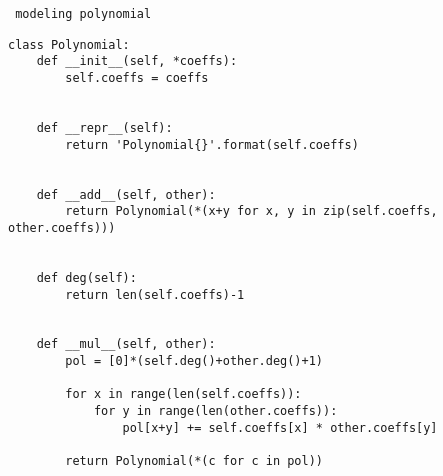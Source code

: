 \begin{center}
\texttt{ modeling polynomial}
\end{center}
\begin{verbatim}
class Polynomial:
	def __init__(self, *coeffs):
		self.coeffs = coeffs

	
	def __repr__(self):
		return 'Polynomial{}'.format(self.coeffs)

	
	def __add__(self, other):
		return Polynomial(*(x+y for x, y in zip(self.coeffs, other.coeffs)))

	
	def deg(self):
		return len(self.coeffs)-1

	
	def __mul__(self, other):
		pol = [0]*(self.deg()+other.deg()+1)
		
		for x in range(len(self.coeffs)):
			for y in range(len(other.coeffs)):
				pol[x+y] += self.coeffs[x] * other.coeffs[y]

		return Polynomial(*(c for c in pol))
\end{verbatim}
